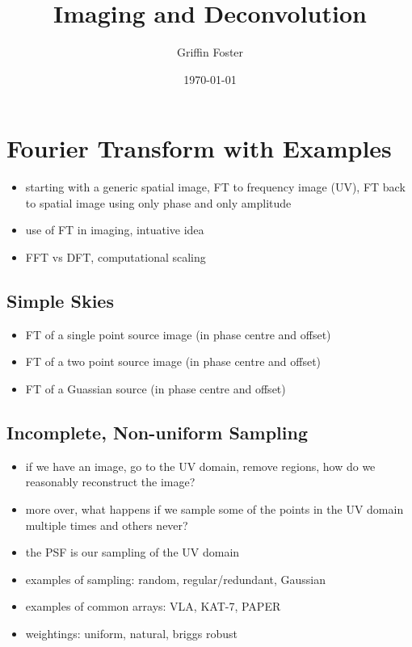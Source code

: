 \documentclass[usenatbib,usegraphicx]{article}
\begin{document}
\title{Imaging and Deconvolution}
\author{Griffin Foster}
\date{\today}
\maketitle

\label{firstpage}

\section{Fourier Transform with Examples}

\begin{itemize}
\item starting with a generic spatial image, FT to frequency image (UV), FT back to spatial image using only phase and only amplitude
\item use of FT in imaging, intuative idea
\item FFT vs DFT, computational scaling
\end{itemize}

\subsection{Simple Skies}

\begin{itemize}
\item FT of a single point source image (in phase centre and offset)
\item FT of a two point source image (in phase centre and offset)
\item FT of a Guassian source (in phase centre and offset)
\end{itemize}

\subsection{Incomplete, Non-uniform Sampling}

\begin{itemize}
\item if we have an image, go to the UV domain, remove regions, how do we reasonably reconstruct the image?
\item more over, what happens if we sample some of the points in the UV domain multiple times and others never?
\item the PSF is our sampling of the UV domain
\item examples of sampling: random, regular/redundant, Gaussian
\item examples of common arrays: VLA, KAT-7, PAPER
\item weightings: uniform, natural, briggs robust
\end{itemize}
\end{document}
